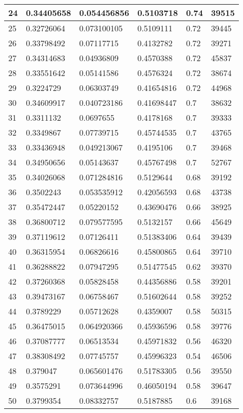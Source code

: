 \begin{longtable}{|l|l|l|l|l|l|}
24 & 0.34405658 & 0.054456856 & 0.5103718 & 0.74 & 39515 \\ \hline 
25 & 0.32726064 & 0.073100105 & 0.5109111 & 0.72 & 39445 \\ \hline 
26 & 0.33798492 & 0.07117715 & 0.4132782 & 0.72 & 39271 \\ \hline 
27 & 0.34314683 & 0.04936809 & 0.4570388 & 0.72 & 45837 \\ \hline 
28 & 0.33551642 & 0.05141586 & 0.4576324 & 0.72 & 38674 \\ \hline 
29 & 0.3224729 & 0.06303749 & 0.41654816 & 0.72 & 44968 \\ \hline 
30 & 0.34609917 & 0.040723186 & 0.41698447 & 0.7 & 38632 \\ \hline 
31 & 0.3311132 & 0.0697655 & 0.4178168 & 0.7 & 39333 \\ \hline 
32 & 0.3349867 & 0.07739715 & 0.45744535 & 0.7 & 43765 \\ \hline 
33 & 0.33436948 & 0.049213067 & 0.4195106 & 0.7 & 39468 \\ \hline 
34 & 0.34950656 & 0.05143637 & 0.45767498 & 0.7 & 52767 \\ \hline 
35 & 0.34026068 & 0.071284816 & 0.5129644 & 0.68 & 39192 \\ \hline 
36 & 0.3502243 & 0.053535912 & 0.42056593 & 0.68 & 43738 \\ \hline 
37 & 0.35472447 & 0.05220152 & 0.43690476 & 0.66 & 38925 \\ \hline 
38 & 0.36800712 & 0.079577595 & 0.5132157 & 0.66 & 45649 \\ \hline 
39 & 0.37119612 & 0.07126411 & 0.51383406 & 0.64 & 39439 \\ \hline 
40 & 0.36315954 & 0.06826616 & 0.45800865 & 0.64 & 39710 \\ \hline 
41 & 0.36288822 & 0.07947295 & 0.51477545 & 0.62 & 39370 \\ \hline 
42 & 0.37260368 & 0.05828458 & 0.44356886 & 0.58 & 39201 \\ \hline 
43 & 0.39473167 & 0.06758467 & 0.51602644 & 0.58 & 39252 \\ \hline 
44 & 0.3789229 & 0.05712628 & 0.4359007 & 0.58 & 50315 \\ \hline 
45 & 0.36475015 & 0.064920366 & 0.45936596 & 0.58 & 39776 \\ \hline 
46 & 0.37087777 & 0.06513534 & 0.45971832 & 0.56 & 46320 \\ \hline 
47 & 0.38308492 & 0.07745757 & 0.45996323 & 0.54 & 46506 \\ \hline 
48 & 0.379047 & 0.065601476 & 0.51783305 & 0.56 & 39550 \\ \hline 
49 & 0.3575291 & 0.073644996 & 0.46050194 & 0.58 & 39647 \\ \hline 
50 & 0.3799354 & 0.08332757 & 0.5187885 & 0.6 & 39168 \\ \hline 
\end{longtable}